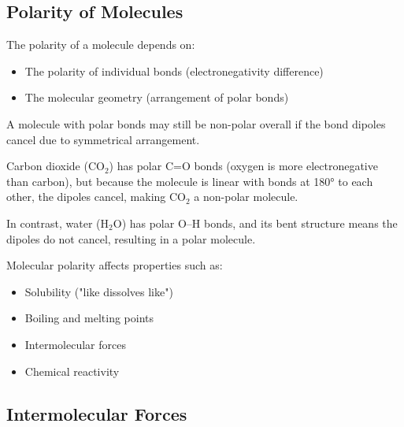 

\subsection{Polarity of Molecules}

The polarity of a molecule depends on:
\begin{itemize}
    \item The polarity of individual bonds (electronegativity difference)
    \item The molecular geometry (arrangement of polar bonds)
\end{itemize}

A molecule with polar bonds may still be non-polar overall if the bond dipoles cancel due to symmetrical arrangement.

\begin{example}
Carbon dioxide (CO$_2$) has polar C=O bonds (oxygen is more electronegative than carbon), but because the molecule is linear with bonds at 180° to each other, the dipoles cancel, making CO$_2$ a non-polar molecule.

In contrast, water (H$_2$O) has polar O–H bonds, and its bent structure means the dipoles do not cancel, resulting in a polar molecule.
\end{example}

Molecular polarity affects properties such as:
\begin{itemize}
    \item Solubility ("like dissolves like")
    \item Boiling and melting points
    \item Intermolecular forces
    \item Chemical reactivity
\end{itemize}

\subsection{Intermolecular Forces}

